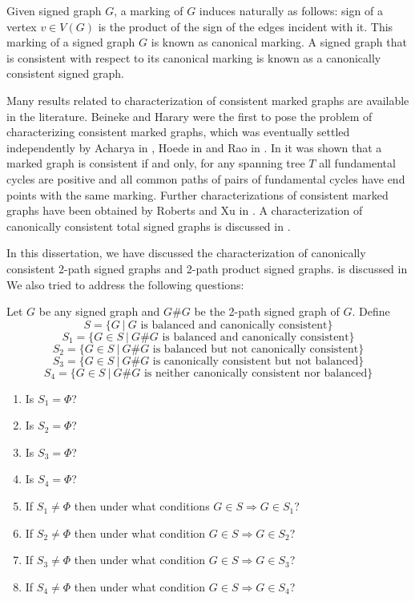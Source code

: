 Given signed graph $G$, a marking of $G$ induces naturally as follows: sign of a vertex $v\in V(G)$ is the product of the sign of 
the edges incident with it. This marking of a signed graph $G$ is known as canonical marking. A signed graph that is consistent 
with respect to its canonical marking is known as a canonically consistent signed graph. 

Many results related to characterization of consistent marked graphs are available in the literature. Beineke  and Harary 
\cite{BEI1978, BEI78} were 
the  first  to  pose  the  problem  of  characterizing  consistent  marked  graphs,  
which  was  eventually  settled  independently  by  Acharya  in \cite{ACH83, ACH84},  Hoede in \cite{HOE92}  
and  Rao in \cite{RAO84}. In \cite{HOE92} it was shown that a marked graph is consistent if and only, for any spanning tree $T$ 
all fundamental cycles are positive and all common paths of pairs of fundamental cycles have end points with the same marking.  
Further characterizations  of  consistent  marked  graphs  
have  been  obtained  by  Roberts  and  Xu in \cite{ROB03, ROB95}.  A 
characterization of canonically consistent total signed graphs is discussed in \cite{SIN13}.

In this dissertation, we have 
discussed the characterization of canonically consistent 2-path signed graphs and 2-path product signed graphs.  is discussed in 
We  also tried to 
address the following questions:

Let $G$ be any signed graph and $G\# G$ be the 2-path signed graph of $G$.
Define $$S=\{G~|~G \text{ is balanced and canonically consistent}\}$$
$$S_1=\{G\in S~|~G\# G \text{ is balanced and canonically consistent}\}$$
$$S_2=\{G\in S~|~G\# G \text{ is balanced but not canonically consistent}\}$$
$$S_3=\{G\in S~|~G\# G \text{ is canonically consistent but not balanced}\}$$
$$S_4=\{G\in S~|~G\# G \text{ is neither canonically consistent nor balanced}\}$$
\begin{enumerate}
 \item Is $S_1=\Phi$?
  \item Is $S_2=\Phi$?
   \item Is $S_3=\Phi$?
    \item Is $S_4=\Phi$?
    \item If $S_1\neq\Phi$ then under what conditions $G\in S\Rightarrow G\in S_1$?
    \item  If $S_2\neq\Phi$ then under what condition $G\in S\Rightarrow G\in S_2$?
    \item If $S_3\neq\Phi$ then under what condition $G\in S\Rightarrow G\in S_3$?
    \item  If $S_4\neq\Phi$ then under what condition $G\in S\Rightarrow G\in S_4$?
\end{enumerate}


